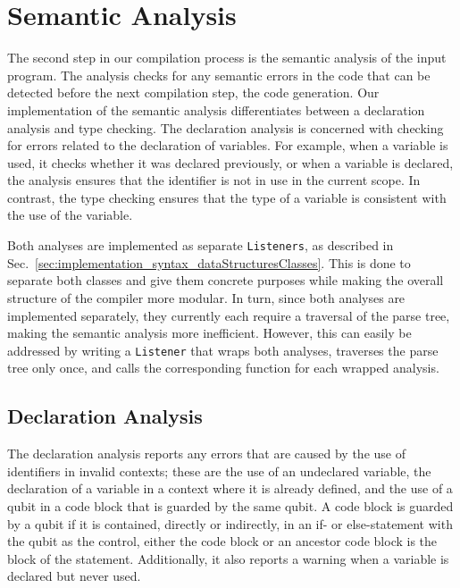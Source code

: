\section{Semantic Analysis}
\label{sec:implementation_semenaticAnalayis}
The second step in our compilation process is the semantic analysis of the input program. The analysis checks for any semantic errors in the code that can be detected before the next compilation step, the code generation. Our implementation of the semantic analysis differentiates between a declaration analysis and type checking. The declaration analysis is concerned with checking for errors related to the declaration of variables. For example, when a variable is used, it checks whether it was declared previously, or when a variable is declared, the analysis ensures that the identifier is not in use in the current scope. In contrast, the type checking ensures that the type of a variable is consistent with the use of the variable.

Both analyses are implemented as separate \texttt{Listeners}, as described in Sec.~\ref{sec:implementation_syntax_dataStructuresClasses}.
This is done to separate both classes and give them concrete purposes while making the overall structure of the compiler more modular. In turn, since both analyses are implemented separately, they currently each require a traversal of the parse tree, making the semantic analysis more inefficient. However, this can easily be addressed by writing a \texttt{Listener} that wraps both analyses, traverses the parse tree only once, and calls the corresponding function for each wrapped analysis.

\subsection{Declaration Analysis}
\label{sec:implementation_declarationAnalayis}
The declaration analysis reports any errors that are caused by the use of identifiers in invalid contexts; these are the use of an undeclared variable, the declaration of a variable in a context where it is already defined, and the use of a qubit in a code block that is guarded by the same qubit. A code block is guarded by a qubit if it is contained, directly or indirectly, in an if- or else-statement with the qubit as the control, \ie either the code block or an ancestor code block is the block of the statement.
Additionally, it also reports a warning when a variable is declared but never used.


